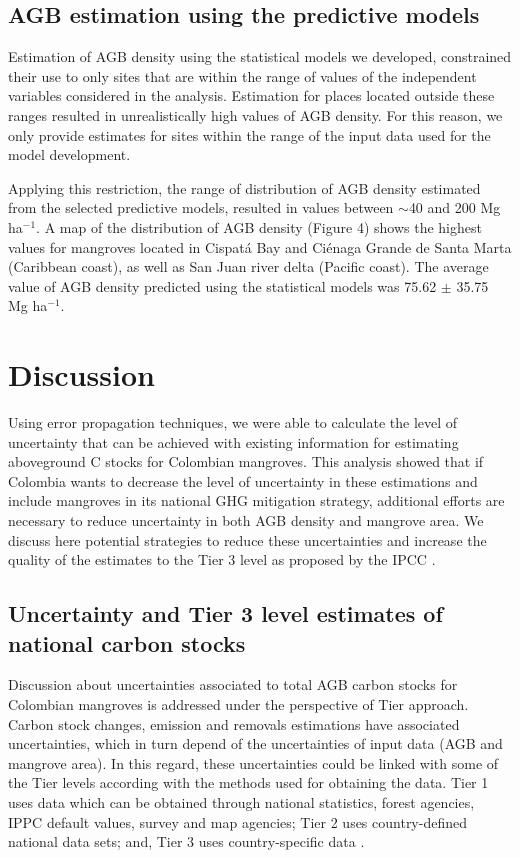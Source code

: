 \documentclass[review, authoryear]{elsarticle}   	%
\begin{document}
\subsection {AGB estimation using the predictive models}
Estimation of AGB density using the statistical models we developed, constrained their use to only sites that are within the range of values  of the independent variables considered in the analysis. Estimation for places located outside these ranges resulted in unrealistically high values of AGB density. For this reason, we only provide estimates for sites within the range of the input data used for the model development. 

Applying this restriction, the range of distribution of AGB density estimated from the selected predictive models, resulted in values between $\sim$40 and 200 Mg ha$^{-1}$. A map of the distribution of AGB density (Figure 4) shows the highest values for mangroves located in Cispatá Bay and Ci\'enaga Grande de Santa Marta (Caribbean coast), as well as San Juan river delta (Pacific coast). The average value of AGB density predicted using the statistical models was 75.62 $\pm$ 35.75 Mg ha$^{-1}$.


\section{Discussion}
Using error propagation techniques, we were able to calculate the level of uncertainty that can be achieved with existing information for estimating aboveground C stocks for Colombian mangroves. This analysis showed that if Colombia wants to decrease the level of uncertainty in these estimations and include mangroves in its national GHG mitigation strategy, additional efforts are necessary to reduce uncertainty in both AGB density and mangrove area. We discuss here potential strategies to reduce these uncertainties and increase the quality of the estimates  to the Tier 3 level  as proposed by the IPCC \citep{IPCC2003, IPCC2006}. 


\subsection {Uncertainty and Tier 3 level estimates of national carbon stocks}

Discussion about uncertainties associated to total AGB carbon stocks for Colombian mangroves is addressed under the perspective of Tier approach. Carbon stock changes, emission and removals estimations have associated uncertainties, which in turn depend of the uncertainties of input data (AGB and mangrove area). In this regard, these uncertainties could be linked with some of the Tier levels according with the methods used for obtaining the data. Tier 1 uses data which can be obtained through national statistics, forest agencies, IPPC default values, survey and map agencies; Tier 2 uses country-defined national data sets; and, Tier 3 uses country-specific data \citep{IPCC2006}.
\end{document}
